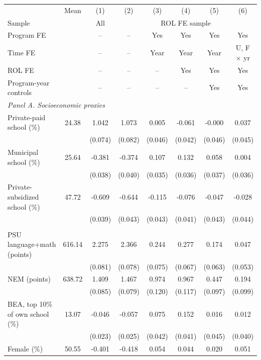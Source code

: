 \begin{tabular}{lc*{6}{c}}
\toprule
 & Mean & (1) & (2) & (3) & (4) & (5) & (6) \\
Sample & & All & \multicolumn{5}{c}{ROL FE sample} \\
Program FE & & -- & -- & Yes & Yes & Yes & Yes \\
Time FE & & -- & -- & Year & Year & Year & U, F \(\times\) yr \\
ROL FE & & -- & -- & -- & Yes & Yes & Yes \\
Program-year controls & & -- & -- & -- & -- & Yes & Yes \\
\midrule
\multicolumn{8}{l}{\textit{Panel A. Socioeconomic proxies}} \\
Private-paid school (\%) &  24.38 &  1.042\sym{***} &  1.073\sym{***} &  0.005 & -0.061 & -0.000 &  0.037 \\
 &  & (0.074) & (0.082) & (0.046) & (0.042) & (0.046) & (0.045) \\
Municipal school (\%) &  25.64 & -0.381\sym{***} & -0.374\sym{***} &  0.107\sym{***} &  0.132\sym{***} &  0.058 &  0.004 \\
 &  & (0.038) & (0.040) & (0.035) & (0.036) & (0.037) & (0.036) \\
Private-subsidized school (\%) &  47.72 & -0.609\sym{***} & -0.644\sym{***} & -0.115\sym{***} & -0.076\sym{*} & -0.047 & -0.028 \\
 &  & (0.039) & (0.043) & (0.043) & (0.041) & (0.043) & (0.044) \\
\addlinespace
\multicolumn{8}{l}{\textit{Panel B. Achievement and other predetermined}} \\
PSU language+math (points) & 616.14 &  2.275\sym{***} &  2.366\sym{***} &  0.244\sym{***} &  0.277\sym{***} &  0.174\sym{***} &  0.047 \\
 &  & (0.081) & (0.078) & (0.075) & (0.067) & (0.063) & (0.053) \\
NEM (points) & 638.72 &  1.409\sym{***} &  1.467\sym{***} &  0.974\sym{***} &  0.967\sym{***} &  0.447\sym{***} &  0.194\sym{*} \\
 &  & (0.085) & (0.079) & (0.120) & (0.117) & (0.097) & (0.099) \\
BEA, top 10\% of own school (\%) &  13.07 & -0.046\sym{**} & -0.057\sym{**} &  0.075\sym{*} &  0.152\sym{***} &  0.016 &  0.012 \\
 &  & (0.023) & (0.025) & (0.042) & (0.041) & (0.045) & (0.040) \\
Female (\%) &  50.55 & -0.401\sym{***} & -0.418\sym{***} &  0.054 &  0.044 &  0.020 &  0.051 \\

\end{tabular}
